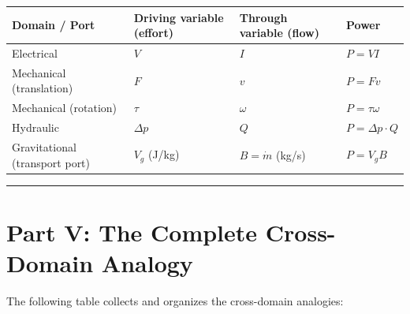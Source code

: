 \documentclass[
]{article}
\begin{document}
\begin{longtable}[]{@{}
  >{\raggedright\arraybackslash}p{}
  >{\raggedright\arraybackslash}p{}
  >{\raggedright\arraybackslash}p{}
  >{\raggedright\arraybackslash}p{}@{}}
\toprule\noalign{}
\begin{minipage}[b]{\linewidth}\raggedright
Domain / Port
\end{minipage} & \begin{minipage}[b]{\linewidth}\raggedright
Driving variable (effort)
\end{minipage} & \begin{minipage}[b]{\linewidth}\raggedright
Through variable (flow)
\end{minipage} & \begin{minipage}[b]{\linewidth}\raggedright
Power
\end{minipage} \\
\midrule\noalign{}
\endhead
\bottomrule\noalign{}
\endlastfoot
Electrical & \(V\) & \(I\) & \(P = VI\) \\
Mechanical (translation) & \(F\) & \(v\) & \(P = Fv\) \\
Mechanical (rotation) & \(\tau\) & \(\omega\) & \(P = \tau\omega\) \\
Hydraulic & \(\Delta p\) & \(Q\) & \(P = \Delta p \cdot Q\) \\
Gravitational (transport port) & \(V_g\) (J/kg) & \(B=\dot{m}\) (kg/s) &
\(P = V_g B\) \\
\end{longtable}

\begin{center}\rule{0.5\linewidth}{0.5pt}\end{center}

\section{Part V: The Complete Cross-Domain
Analogy}\label{part-v-the-complete-cross-domain-analogy}

The following table collects and organizes the cross-domain analogies:
\end{document}
